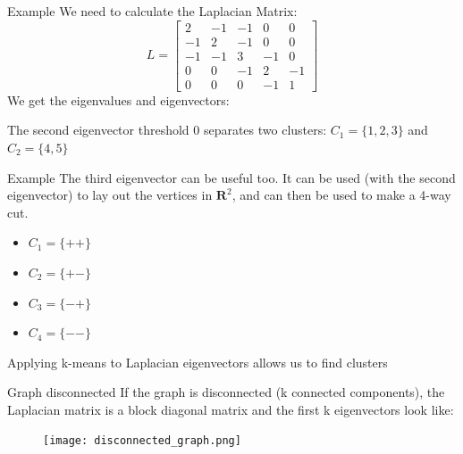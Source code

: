\documentclass{beamer}
\begin{document}
\begin{frame}{Example}
We need to calculate the Laplacian Matrix:
$$ L= \begin{bmatrix}
2 & -1 & -1 & 0 & 0 \\
-1 & 2 & -1 & 0 & 0 \\
-1 & -1 & 3 & -1 & 0 \\
0 & 0 & -1 & 2 & -1 \\
0 & 0 & 0 & -1 & 1 
\end{bmatrix}$$
We get the eigenvalues and eigenvectors:
\begin{center}
\end{center}

The second eigenvector threshold 0 separates two clusters: $C_1=\{1,2,3\}$ and $C_2=\{4,5\}$
\end{frame}

\begin{frame}{Example}
The third eigenvector can be useful too. It can be used (with the second eigenvector) to lay out the vertices in $\mathbf{R}^2$, and can then be used to make a 4-way cut.
\begin{itemize}
\item $C_1=\{+ +\}$
\item $C_2=\{+ -\}$
\item $C_3=\{- +\}$
\item $C_4=\{- -\}$
\end{itemize}

Applying k-means to Laplacian eigenvectors allows us to find clusters
\end{frame}

\begin{frame}{Graph disconnected}
If the graph is disconnected (k connected components), the Laplacian matrix is a block diagonal matrix and the first k eigenvectors look like:
\begin{figure}
        \centering
        \texttt{[image: disconnected\_graph.png]}
        \label{fig:enter-label}
\end{figure}

\end{frame}
\end{document}
